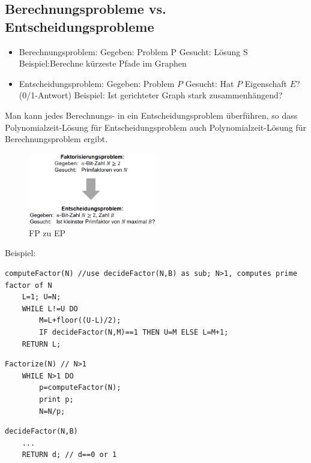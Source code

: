 \documentclass{article}
\begin{document}
        \subsection{Berechnungsprobleme vs. Entscheidungsprobleme}
            \begin{itemize}
                \item Berechnungsproblem:
                    \subitem Gegeben: Problem P
                    \subitem Gesucht: Lösung S
                    \subitem Beispiel:Berechne kürzeste Pfade im Graphen
                \item Entscheidungsproblem:
                    \subitem Gegeben: Problem $P$
                    \subitem Gesucht: Hat $P$ Eigenschaft $E$? (0/1-Antwort)
                    \subitem Beispiel: Ist gerichteter Graph stark zusammenhängend?
            \end{itemize}
            Man kann jedes Berechnungs- in ein Entscheidungsproblem überführen, so dass Polynomialzeit-Lösung für Entscheidungsproblem auch Polynomialzeit-Lösung für Berechnungsproblem ergibt.\\
            \begin{figure}[ht]
                \centering
                \includegraphics[width=0.5\textwidth]{Bilder/FakZuEn.png}
                \caption{FP zu EP}
                \label{fig:FakZuEn}
            \end{figure}
            \newpage
            Beispiel:
            \begin{lstlisting}[style=pseudocode]
computeFactor(N) //use decideFactor(N,B) as sub; N>1, computes prime factor of N
    L=1; U=N;
    WHILE L!=U DO
        M=L+floor((U-L)/2);
        IF decideFactor(N,M)==1 THEN U=M ELSE L=M+1;
    RETURN L;
            \end{lstlisting}
            \begin{lstlisting}[style=pseudocode]
Factorize(N) // N>1
    WHILE N>1 DO
        p=computeFactor(N);
        print p;
        N=N/p;
            \end{lstlisting}
            \begin{lstlisting}[style=pseudocode]
decideFactor(N,B)
    ...
    RETURN d; // d==0 or 1
            \end{lstlisting}
\end{document}
